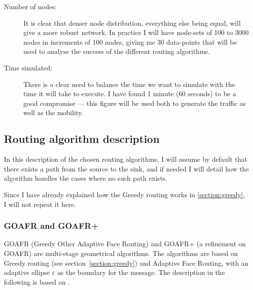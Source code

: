 \begin{description}
\item[Number of nodes:] It is clear that denser node distribution, everything else being equal, will give a more robust network. In practice I will have node-sets of 100 to 3000 nodes in increments of 100 nodes, giving me 30 data-points that will be used to analyse the success of the different routing algorithms.  

\item[Time simulated:] There is a clear need to balance the time we want to simulate with the time it will take to execute. I have found 1 minute (60 seconds) to be a good compromise --- this figure will be used both to generate the traffic as well as the mobility.
\end{description}


\subsection{Routing algorithm description}
\label{section:routing_algorithm}
In this description of the chosen routing algorithms, I will assume by default that there exists a path from the source to the sink, and if needed I will detail how the algorithm handles the cases where no such path exists.

Since I have already explained how the Greedy routing works in \ref{section:greedy}, I will not repeat it here.

\subsubsection{GOAFR and GOAFR+}


GOAFR \cite{gopher} (Greedy Other Adaptive Face Routing) and GOAFR+ \cite{gopher+} (a refinement on GOAFR) are multi-stage geometrical algorithms. The algorithms are based on Greedy routing (see section~\ref{section:greedy}) and Adaptive Face Routing, with an adaptive ellipse $\varepsilon$ as the boundary for the message. The description in the following is based on \cite{gopher}.

